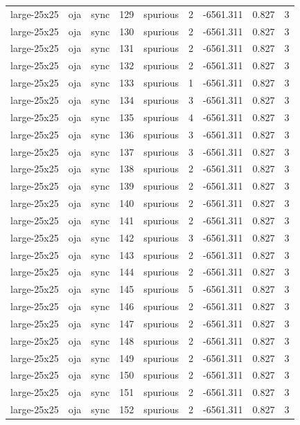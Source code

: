 \begin{tabular}{lllrlrrrr}
large-25x25 & oja & sync & 129 & spurious & 2 & -6561.311 & 0.827 & 3 \\
large-25x25 & oja & sync & 130 & spurious & 2 & -6561.311 & 0.827 & 3 \\
large-25x25 & oja & sync & 131 & spurious & 2 & -6561.311 & 0.827 & 3 \\
large-25x25 & oja & sync & 132 & spurious & 2 & -6561.311 & 0.827 & 3 \\
large-25x25 & oja & sync & 133 & spurious & 1 & -6561.311 & 0.827 & 3 \\
large-25x25 & oja & sync & 134 & spurious & 3 & -6561.311 & 0.827 & 3 \\
large-25x25 & oja & sync & 135 & spurious & 4 & -6561.311 & 0.827 & 3 \\
large-25x25 & oja & sync & 136 & spurious & 3 & -6561.311 & 0.827 & 3 \\
large-25x25 & oja & sync & 137 & spurious & 3 & -6561.311 & 0.827 & 3 \\
large-25x25 & oja & sync & 138 & spurious & 2 & -6561.311 & 0.827 & 3 \\
large-25x25 & oja & sync & 139 & spurious & 2 & -6561.311 & 0.827 & 3 \\
large-25x25 & oja & sync & 140 & spurious & 2 & -6561.311 & 0.827 & 3 \\
large-25x25 & oja & sync & 141 & spurious & 2 & -6561.311 & 0.827 & 3 \\
large-25x25 & oja & sync & 142 & spurious & 3 & -6561.311 & 0.827 & 3 \\
large-25x25 & oja & sync & 143 & spurious & 2 & -6561.311 & 0.827 & 3 \\
large-25x25 & oja & sync & 144 & spurious & 2 & -6561.311 & 0.827 & 3 \\
large-25x25 & oja & sync & 145 & spurious & 5 & -6561.311 & 0.827 & 3 \\
large-25x25 & oja & sync & 146 & spurious & 2 & -6561.311 & 0.827 & 3 \\
large-25x25 & oja & sync & 147 & spurious & 2 & -6561.311 & 0.827 & 3 \\
large-25x25 & oja & sync & 148 & spurious & 2 & -6561.311 & 0.827 & 3 \\
large-25x25 & oja & sync & 149 & spurious & 2 & -6561.311 & 0.827 & 3 \\
large-25x25 & oja & sync & 150 & spurious & 2 & -6561.311 & 0.827 & 3 \\
large-25x25 & oja & sync & 151 & spurious & 2 & -6561.311 & 0.827 & 3 \\
large-25x25 & oja & sync & 152 & spurious & 2 & -6561.311 & 0.827 & 3 \\

\end{tabular}
